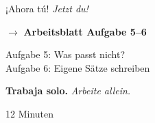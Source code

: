 \documentclass[aspectratio=169, 11pt]{beamer}
\newcommand{\seriftext}[1]{{\fontfamily{ppl}\selectfont #1}}
\newcommand{\es}[1]{\seriftext{\textbf{#1}}}
\newcommand{\de}[1]{\textit{\textcolor{mittelgrau}{#1}}}
\newcommand{\abmark}[1]{{\Large$\rightarrow$ \textbf{Arbeitsblatt Aufgabe #1}}}
\newcommand{\zeit}[1]{{\small\textcolor{mittelgrau}{#1}}}
\begin{document}
\begin{frame}{¡Ahora tú! \de{Jetzt du!}}
    \vspace{1cm}

    \begin{center}
        \abmark{5--6}

        \vspace{0.8cm}

        {\large Aufgabe 5: Was passt nicht?}\\
        {\large Aufgabe 6: Eigene Sätze schreiben}

        \vspace{0.8cm}

        \es{Trabaja solo.} \de{Arbeite allein.}

        \vspace{0.5cm}

        \zeit{12 Minuten}
    \end{center}
\end{frame}
\end{document}
